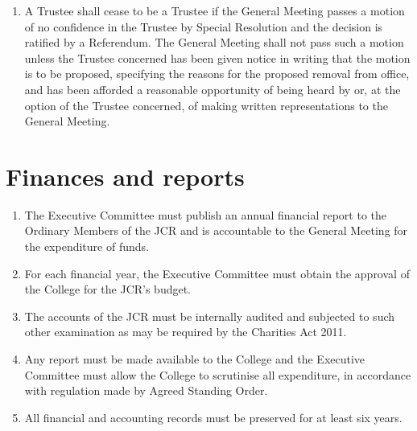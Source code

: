 \documentclass[11pt,a4paper, oneside]{memoir}
\begin{document}
\begin{enumerate}
\begin{enumerate}
	 	\end{enumerate}
	 	\item \label{Cl:TrusteeNoCon} A Trustee shall cease to be a Trustee if the General Meeting passes a motion of no confidence in the Trustee by Special Resolution and the decision is ratified by a Referendum.
	 	The General Meeting shall not pass such a motion unless the Trustee concerned has been given notice in writing that the motion is to be proposed, specifying the reasons for the proposed removal from office, and has been afforded a reasonable opportunity of being heard by or, at the option of the Trustee concerned, of making written representations to the General Meeting.
	 \end{enumerate}
	\section{Finances and reports} \label{Art:TrusteeFinances}
	\begin{enumerate}
		\item The Executive Committee must publish an annual financial report to the Ordinary Members of the JCR and is accountable to the General Meeting for the expenditure of funds.
		\item For each financial year, the Executive Committee must obtain the approval of the College for the JCR's budget.
		\item The accounts of the JCR must be internally audited and subjected to such other examination as may be required by the Charities Act 2011.
		\item Any report must be made available to the College and the Executive Committee must allow the College to scrutinise all expenditure, in accordance with regulation made by Agreed Standing Order.
		\item All financial and accounting records must be preserved for at least six years.
	\end{enumerate}
\end{document}
